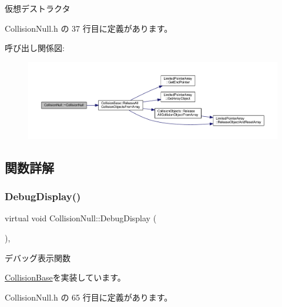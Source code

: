 仮想デストラクタ 



 Collision\+Null.\+h の 37 行目に定義があります。

呼び出し関係図\+:\nopagebreak
\begin{figure}[H]
\begin{center}
\leavevmode
\includegraphics[width=350pt]{class_collision_null_a2eaef584b2ae2c4062df8bf3a6533fb3_cgraph}
\end{center}
\end{figure}


\subsection{関数詳解}
\mbox{\label{class_collision_null_a3ee0dacfb13c949538519f39d2f6fb0f}} 
\subsubsection{\texorpdfstring{Debug\+Display()}{DebugDisplay()}}
{\footnotesize\ttfamily virtual void Collision\+Null\+::\+Debug\+Display (\begin{DoxyParamCaption}{ }\end{DoxyParamCaption})\hspace{0.3cm}{\ttfamily [inline]}, {\ttfamily [virtual]}}



デバッグ表示関数 



\mbox{\hyperlink{class_collision_base_a0b2c1e3b090431d596b6a17e81360932}{Collision\+Base}}を実装しています。



 Collision\+Null.\+h の 65 行目に定義があります。

\mbox{\label{class_collision_null_a580f507d8918865679feec3cc7b613d1}} 
